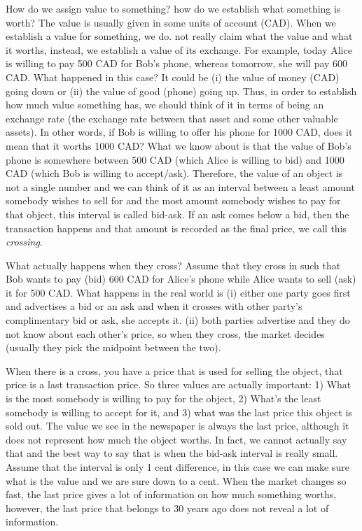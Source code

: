 How do we assign value to something? how do we establish what something is worth?
The value is usually given in some units of account (\eg CAD). When we establish a value for something, we do. not really claim what the value and what it worths, instead, we establish a value of its exchange. For example, today Alice is willing to pay 500 CAD for Bob's phone, whereas tomorrow, she will pay 600 CAD. What happened in this case? It could be (i) the value of money (CAD) going down or (ii) the value of good (phone) going up. Thus, in order to establish how much value something has, we should think of it in terms of being an exchange rate (the exchange rate between that asset and some other valuable assets). In other words, if Bob is willing to offer his phone for 1000 CAD, does it mean that it worths 1000 CAD? What we know about is that the value of Bob's phone is somewhere between 500 CAD (which Alice is willing to bid) and 1000 CAD (which Bob is willing to accept/ask). Therefore, the value of an object is not a single number and we can think of it as an interval between a least amount somebody wishes to sell for and the most amount somebody wishes to pay for that object, this interval is called bid-ask. If an ask comes below a bid, then the transaction happens and that amount is recorded as the final price, we call this \textit{crossing}. \par
What actually happens when they cross? Assume that they cross in such that Bob wants to pay (bid) 600 CAD for Alice's phone while Alice wants to sell (ask) it for 500 CAD. What happens in the real world is (i) either one party goes first and advertises a bid or an ask and when it crosses with other party's complimentary bid or ask, she accepts it. (ii) both parties advertise and they do not know about each other's price, so when they cross, the market decides (usually they pick the midpoint between the two). \par
When there is a cross, you have a price that is used for selling the object, that price is a last transaction price. So three values are actually important: 1) What is the most somebody is willing to pay for the object, 2) What's the least somebody is willing to accept for it, and 3) what was the last price this object is sold out. The value we see in the newspaper is always the last price, although it does not represent how much the object worths. In fact, we cannot actually say that and the best way to say that is when the bid-ask interval is really small. Assume that the interval is only 1 cent difference, in this case we can make sure what is the value and we are sure down to a cent. When the market changes so fast, the last price gives a lot of information on how much something worths, however, the last price that belongs to 30 years ago does not reveal a lot of information.

